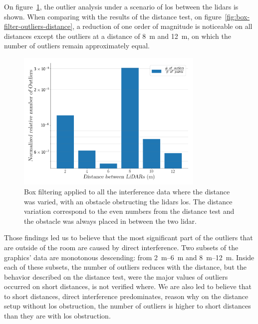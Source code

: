 On figure~\ref{fig:box-filter-outliers-LOS}, the outlier analysis under a scenario of \ac{los} between the \acp{lidar} is shown. When comparing with the results of the distance test, on figure~\ref{fig:box-filter-outliers-distance}, a reduction of one order of magnitude is noticeable on all distances except the outliers at a distance of \SI{8}{\meter} and \SI{12}{\meter}, on which the number of outliers remain approximately equal. 

\begin{figure}[!ht]
	\centering
	\includegraphics[width=0.8\textwidth]{img/lidar-interference/box-filtering/interference-box-filter-outliers-LOS.png}
	\caption{Box filtering applied to all the interference data where the distance was varied, with an obstacle obstructing the \acp{lidar} \ac{los}. The distance variation correspond to the even numbers from the distance test and the obstacle was always placed in between the two \ac{lidar}.}
	\label{fig:box-filter-outliers-LOS}
\end{figure}

Those findings led us to believe that the most significant part of the outliers that are outside of the room are caused by direct interference. Two subsets of the graphics' data are monotonous descending: from \SIrange{2}{6}{\meter} and \SIrange{8}{12}{\meter}. Inside each of these subsets, the number of outliers reduces with the distance, but the behavior described on the distance test, were the major values of outliers occurred on short distances, is not verified where. We are also led to believe that to short distances, direct interference predominates, reason why on the distance setup without \ac{los} obstruction, the number of outliers is higher to short distances than they are with \ac{los} obstruction.

